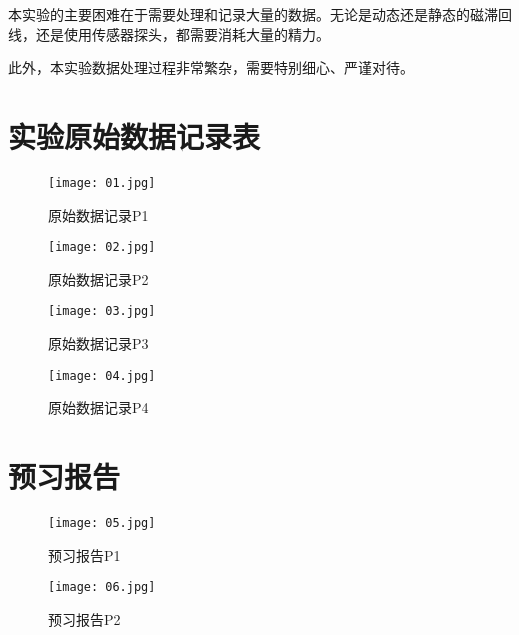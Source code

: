 \documentclass[11pt]{article}
\begin{document}
本实验的主要困难在于需要处理和记录大量的数据。无论是动态还是静态的磁滞回线，还是使用传感器探头，都需要消耗大量的精力。

此外，本实验数据处理过程非常繁杂，需要特别细心、严谨对待。

\section{实验原始数据记录表}

\begin{figure}[H]
    \centering
    \texttt{[image: 01.jpg]}
    \caption{原始数据记录P1}
\end{figure}
\begin{figure}[H]
    \centering
    \texttt{[image: 02.jpg]}
    \caption{原始数据记录P2}
\end{figure}
\begin{figure}[H]
    \centering
    \texttt{[image: 03.jpg]}
    \caption{原始数据记录P3}
\end{figure}
\begin{figure}[H]
    \centering
    \texttt{[image: 04.jpg]}
    \caption{原始数据记录P4}
\end{figure}

\section{预习报告}

\begin{figure}[H]
    \centering
    \texttt{[image: 05.jpg]}
    \caption{预习报告P1}
\end{figure}
\begin{figure}[H]
    \centering
    \texttt{[image: 06.jpg]}
    \caption{预习报告P2}
\end{figure}
\end{document}
